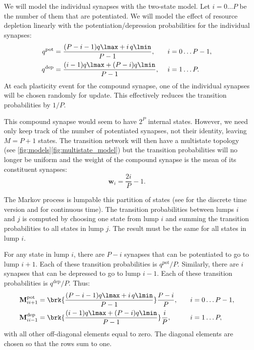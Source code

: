 \documentclass[10pt]{article}
\newcommand{\w}{\mathbf{w}}
\newcommand{\M}{\mathbf{M}}
\newcommand{\pot}{^{\text{pot}}}
\newcommand{\dep}{^{\text{dep}}}
\begin{document}
We will model the individual synapses with the two-state model.
Let $i=0\ldots P$ be the number of them that are potentiated.
We will model the effect of resource depletion linearly with the potentiation/depression probabilities for the individual synapses:
%
\begin{equation}\label{eq:depletion}
  \begin{aligned}
    q\pot &= \frac{(P-i-1)q\lmax + i\,q\lmin}{P-1}, \quad& i &= 0 \ldots P-1,\\
    q\dep &= \frac{(i-1)q\lmax + (P-i)q\lmin}{P-1}, & i &= 1 \ldots P.
  \end{aligned}
\end{equation}
%
At each plasticity event for the compound synapse, one of the individual synapses will be chosen randomly for update.
This effectively reduces the transition probabilities by $1/P$.

This compound synapse would seem to have $2^P$ internal states.
However, we need only keep track of the number of potentiated synapses, not their identity, leaving $M=P+1$ states.
The transition network will then have a multistate topology (see \autoref{fig:models}\ref{fig:multistate_model}) but the transition probabilities will no longer be uniform and the weight of the compound synapse is the mean of its constituent synapses:
%
\begin{equation}\label{eq:pooledweight}
  \w_i = \frac{2i}{P}-1.
\end{equation}
%


The Markov process is lumpable \wrt this partition of states (see \cite[\S6.3]{kemeny1960finite} for the discrete time version and \cite{burke1958markovian,Ball1993Lumpability} for continuous time).
The transition probabilities between lumps $i$ and $j$ is computed by choosing one state from lump $i$ and summing the transition probabilities to all states in lump $j$.
The result must be the same for all states in lump $i$.

For any state in lump $i$, there are $P-i$ synapses that can be potentiated to go to lump $i+1$.
Each of these transition probabilities is $q\pot/P$.
Similarly, there are $i$ synapses that can be depressed to go to lump $i-1$.
Each of these transition probabilities is $q\dep/P$.
Thus:
%
\begin{equation}\label{eq:pooledpotdep}
  \begin{aligned}
    \M\pot_{ii+1} &=  \brk{\frac{(P-i-1)q\lmax + i\,q\lmin}{P-1}} \frac{P-i}{P} ,
      \quad& i &= 0 \ldots P-1,\\
    \M\dep_{ii-1} &=  \brk{\frac{(i-1)q\lmax + (P-i)q\lmin}{P-1}} \frac{i}{P} ,
           & i &= 1 \ldots P,
  \end{aligned}
\end{equation}
%
with all other off-diagonal elements equal to zero.
The diagonal elements are chosen so that the rows sum to one.
\end{document}
